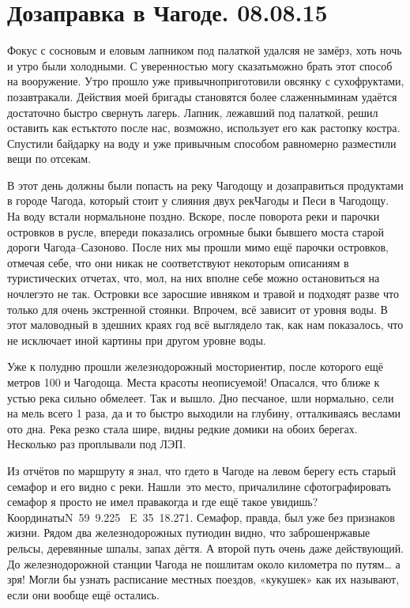 \chapter{Дозаправка в Чагоде. 08.08.15}

Фокус с сосновым и еловым лапником под палаткой удался\mdash я не замёрз, хоть ночь и утро были холодными. С уверенностью могу сказать\mdash можно брать этот способ на вооружение. Утро прошло уже привычно\mdash приготовили овсянку с сухофруктами, позавтракали. Действия моей бригады становятся более слаженными\mdash нам удаётся достаточно быстро свернуть лагерь. Лапник, лежавший под палаткой, решил оставить как есть\mdash кто\sdash то после нас, возможно, использует его как растопку костра. Спустили байдарку на воду и уже привычным  способом равномерно разместили вещи по отсекам. 

В этот день должны были попасть на реку Чагодощу и дозаправиться продуктами в городе Чагода, который стоит у слияния двух рек\mdash Чагоды и Песи в Чагодощу. На воду встали нормально\mdash не поздно. Вскоре, после поворота реки и парочки островков в русле, впереди показались огромные быки бывшего моста старой дороги Чагода\nobreakdash--Сазоново. После них мы прошли мимо ещё парочки островков, отмечая себе, что они никак не соответствуют некоторым описаниям в туристических отчетах, что, мол, на них вполне себе можно остановиться на ночлег\mdash это не так. Островки все заросшие ивняком и травой и подходят разве что только для очень экстренной стоянки. Впрочем, всё зависит от уровня воды. В этот маловодный в здешних краях год всё выглядело так, как нам показалось, что не исключает иной картины при другом уровне воды. 

Уже к полудню прошли железнодорожный мост\mdash ориентир, после которого ещё метров 100 и Чагодоща. Места красоты неописуемой! Опасался, что ближе к устью река сильно обмелеет. Так и вышло. Дно песчаное, шли нормально, сели на мель всего 1 раза, да и то быстро выходили на глубину, отталкиваясь веслами ото дна. Река резко стала шире, видны редкие домики на обоих берегах. Несколько раз проплывали под ЛЭП. 

Из отчётов по маршруту я знал, что где\sdash то в Чагоде на левом берегу есть старый семафор и его видно с реки. Нашли~это место, причалили\mdash не сфотографировать семафор я просто не имел права\mdash когда и где ещё такое увидишь? Координаты\mdash N~59\degree~9.225\textprime~ E~35\degree~18.271\textprime. Семафор, правда, был уже без признаков жизни. Рядом два железнодорожных пути\mdash один видно, что заброшен\mdash ржавые рельсы, деревянные шпалы, запах дёгтя. А второй путь очень даже действующий. До железнодорожной станции Чагода не пошли\mdash там около километра по путям… а зря! Могли бы узнать расписание местных поездов, «кукушек» как их называют, если они вообще ещё остались. 

